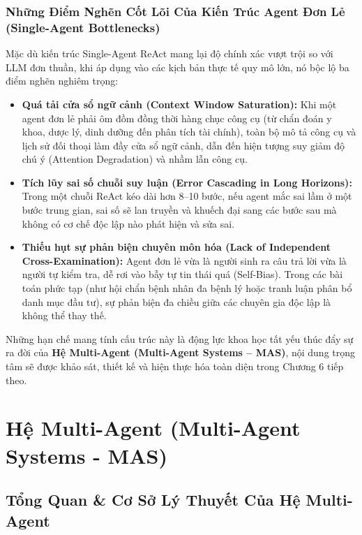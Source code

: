 \documentclass[12pt,a4paper]{report}
\begin{document}
\subsection{Những Điểm Nghẽn Cốt Lõi Của Kiến Trúc Agent Đơn Lẻ (Single-Agent Bottlenecks)}

Mặc dù kiến trúc Single-Agent ReAct mang lại độ chính xác vượt trội so với LLM đơn thuần, khi áp dụng vào các kịch bản thực tế quy mô lớn, nó bộc lộ ba điểm nghẽn nghiêm trọng:
\begin{itemize}[leftmargin=1.2cm]
    \item \textbf{Quá tải cửa sổ ngữ cảnh (Context Window Saturation):} Khi một agent đơn lẻ phải ôm đồm đồng thời hàng chục công cụ (từ chẩn đoán y khoa, dược lý, dinh dưỡng đến phân tích tài chính), toàn bộ mô tả công cụ và lịch sử đối thoại làm đầy cửa sổ ngữ cảnh, dẫn đến hiện tượng suy giảm độ chú ý (Attention Degradation) và nhầm lẫn công cụ.
    \item \textbf{Tích lũy sai số chuỗi suy luận (Error Cascading in Long Horizons):} Trong một chuỗi ReAct kéo dài hơn 8--10 bước, nếu agent mắc sai lầm ở một bước trung gian, sai số sẽ lan truyền và khuếch đại sang các bước sau mà không có cơ chế độc lập nào phát hiện và sửa sai.
    \item \textbf{Thiếu hụt sự phản biện chuyên môn hóa (Lack of Independent Cross-Examination):} Agent đơn lẻ vừa là người sinh ra câu trả lời vừa là người tự kiểm tra, dễ rơi vào bẫy tự tin thái quá (Self-Bias). Trong các bài toán phức tạp (như hội chẩn bệnh nhân đa bệnh lý hoặc tranh luận phân bổ danh mục đầu tư), sự phản biện đa chiều giữa các chuyên gia độc lập là không thể thay thế.
\end{itemize}

Những hạn chế mang tính cấu trúc này là động lực khoa học tất yếu thúc đẩy sự ra đời của \textbf{Hệ Multi-Agent (Multi-Agent Systems -- MAS)}, nội dung trọng tâm sẽ được khảo sát, thiết kế và hiện thực hóa toàn diện trong Chương 6 tiếp theo.


\chapter{Hệ Multi-Agent (Multi-Agent Systems - MAS)}

\section{Tổng Quan \& Cơ Sở Lý Thuyết Của Hệ Multi-Agent}
\end{document}
